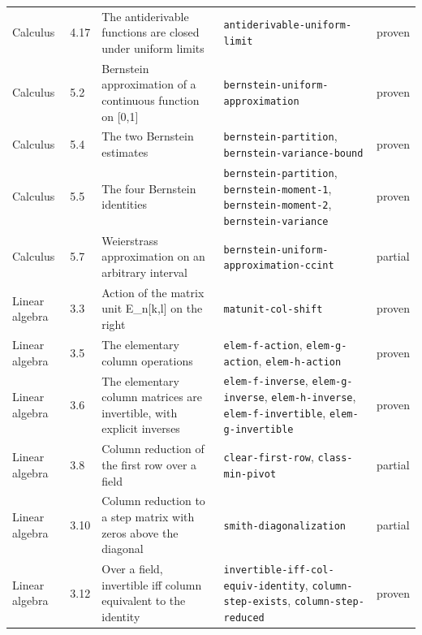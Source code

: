 \begin{longtable}{@{}ll>{\raggedright\arraybackslash}p{4.2cm}>{\raggedright\arraybackslash}p{4.2cm}l@{}}
Calculus & 4.17 & The antiderivable functions are closed under uniform limits & \texttt{antiderivable-\allowbreak{}uniform-\allowbreak{}limit} & proven \\
Calculus & 5.2 & Bernstein approximation of a continuous function on [0,1] & \texttt{bernstein-\allowbreak{}uniform-\allowbreak{}approximation} & proven \\
Calculus & 5.4 & The two Bernstein estimates & \texttt{bernstein-\allowbreak{}partition}, \texttt{bernstein-\allowbreak{}variance-\allowbreak{}bound} & proven \\
Calculus & 5.5 & The four Bernstein identities & \texttt{bernstein-\allowbreak{}partition}, \texttt{bernstein-\allowbreak{}moment-\allowbreak{}1}, \texttt{bernstein-\allowbreak{}moment-\allowbreak{}2}, \texttt{bernstein-\allowbreak{}variance} & proven \\
Calculus & 5.7 & Weierstrass approximation on an arbitrary interval & \texttt{bernstein-\allowbreak{}uniform-\allowbreak{}approximation-\allowbreak{}ccint} & partial \\
Linear algebra & 3.3 & Action of the matrix unit E\_n[k,l] on the right & \texttt{matunit-\allowbreak{}col-\allowbreak{}shift} & proven \\
Linear algebra & 3.5 & The elementary column operations & \texttt{elem-\allowbreak{}f-\allowbreak{}action}, \texttt{elem-\allowbreak{}g-\allowbreak{}action}, \texttt{elem-\allowbreak{}h-\allowbreak{}action} & proven \\
Linear algebra & 3.6 & The elementary column matrices are invertible, with explicit inverses & \texttt{elem-\allowbreak{}f-\allowbreak{}inverse}, \texttt{elem-\allowbreak{}g-\allowbreak{}inverse}, \texttt{elem-\allowbreak{}h-\allowbreak{}inverse}, \texttt{elem-\allowbreak{}f-\allowbreak{}invertible}, \texttt{elem-\allowbreak{}g-\allowbreak{}invertible} & proven \\
Linear algebra & 3.8 & Column reduction of the first row over a field & \texttt{clear-\allowbreak{}first-\allowbreak{}row}, \texttt{class-\allowbreak{}min-\allowbreak{}pivot} & partial \\
Linear algebra & 3.10 & Column reduction to a step matrix with zeros above the diagonal & \texttt{smith-\allowbreak{}diagonalization} & partial \\
Linear algebra & 3.12 & Over a field, invertible iff column equivalent to the identity & \texttt{invertible-\allowbreak{}iff-\allowbreak{}col-\allowbreak{}equiv-\allowbreak{}identity}, \texttt{column-\allowbreak{}step-\allowbreak{}exists}, \texttt{column-\allowbreak{}step-\allowbreak{}reduced} & proven \\

\end{longtable}
